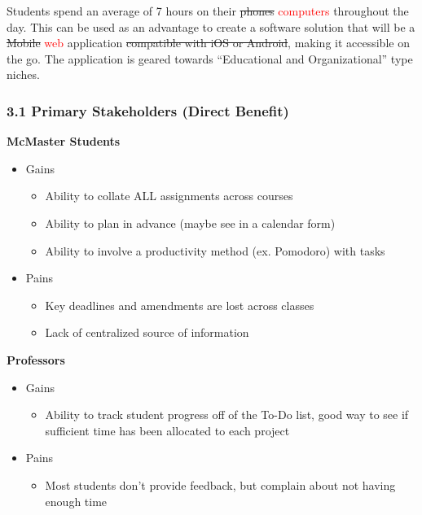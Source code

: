 \documentclass[11pt, oneside]{article}   	%
\begin{document}
Students spend an average of 7 hours on their \sout{phones} \textcolor{red}{computers} throughout the day. This can be used as an advantage to create a software solution that will be a \sout{Mobile} \textcolor{red}{web} application \sout{compatible with iOS or Android}, making it accessible on the go. The application is geared towards “Educational and Organizational” type niches.

\newpage
\subsubsection*{3.1 Primary Stakeholders (Direct Benefit)}
\textbf{McMaster Students}
\begin{itemize}
\setlength\itemsep{1pt}
\item Gains
\begin{itemize}
\setlength\itemsep{1pt}
\item Ability to collate ALL assignments across courses 
\item Ability to plan in advance (maybe see in a calendar form)
\item Ability to involve a productivity method (ex. Pomodoro) with tasks
\end{itemize}

\item Pains
\begin{itemize}
\setlength\itemsep{1pt}
\item Key deadlines and amendments are lost across classes
\item Lack of centralized source of information
\end{itemize}
\end{itemize}

\textbf{Professors}
\begin{itemize}
\setlength\itemsep{1pt}
\item Gains
\begin{itemize}
\setlength\itemsep{1pt}
\item Ability to track student progress off of the To-Do list, good way to see if sufficient time has been allocated to each project
\end{itemize}

\item Pains
\begin{itemize}
\setlength\itemsep{1pt}
\item Most students don’t provide feedback, but complain about not having enough time
\end{itemize}
\end{itemize}
\end{document}

